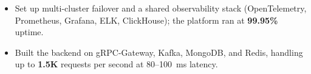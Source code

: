 
\projDattingQ
\begin{itemize}
    \item Set up multi-cluster failover and a shared observability stack (OpenTelemetry, Prometheus, Grafana, ELK, ClickHouse); the platform ran at \textbf{99.95\%} uptime. %
    \item Built the backend on gRPC-Gateway, Kafka, MongoDB, and Redis, handling up to \textbf{1.5K} requests per second at 80--100~ms latency. %
\end{itemize}

\cveducation


